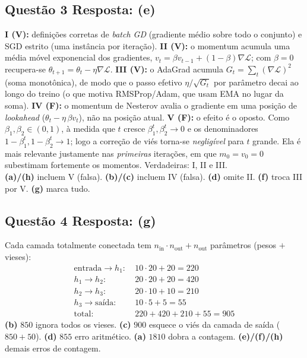 \documentclass[11pt,a4paper]{article}
\begin{document}
\subsection*{Questão 3 \textemdash{} Resposta: (e)}
\textbf{I (V):} definições corretas de \textit{batch GD} (gradiente médio sobre todo o conjunto) e SGD estrito (uma instância por iteração).
\textbf{II (V):} o momentum acumula uma média móvel exponencial dos gradientes, $v_t = \beta v_{t-1} + (1-\beta)\nabla\mathcal{L}$; com $\beta = 0$ recupera-se $\theta_{t+1} = \theta_t - \eta\nabla\mathcal{L}$.
\textbf{III (V):} o AdaGrad acumula $G_t = \sum_t (\nabla\mathcal{L})^2$ (soma monotônica), de modo que o passo efetivo $\eta/\sqrt{G_t}$ por parâmetro decai ao longo do treino (o que motiva RMSProp/Adam, que usam EMA no lugar da soma).
\textbf{IV (F):} o momentum de Nesterov avalia o gradiente em uma posição de \textit{lookahead} ($\theta_t - \eta\,\beta v_t$), não na posição atual.
\textbf{V (F):} o efeito é o oposto. Como $\beta_1, \beta_2 \in (0,1)$, à medida que $t$ cresce $\beta_1^{t}, \beta_2^{t} \to 0$ e os denominadores $1-\beta_1^{t}, 1-\beta_2^{t} \to 1$; logo a correção de viés torna-se \emph{negligível} para $t$ grande. Ela é mais relevante justamente nas \emph{primeiras} iterações, em que $m_0 = v_0 = 0$ subestimam fortemente os momentos.
Verdadeiras: I, II e III.\\
\textbf{(a)/(h)} incluem V (falsa).
\textbf{(b)/(c)} incluem IV (falsa).
\textbf{(d)} omite II.
\textbf{(f)} troca III por V.
\textbf{(g)} marca tudo.

\subsection*{Questão 4 \textemdash{} Resposta: (g)}
Cada camada totalmente conectada tem $n_{\text{in}}\cdot n_{\text{out}} + n_{\text{out}}$ parâmetros (pesos $+$ vieses):
\begin{align*}
    \text{entrada}\to h_1:&\ 10\cdot 20 + 20 = 220 \\
    h_1 \to h_2:&\ 20\cdot 20 + 20 = 420 \\
    h_2 \to h_3:&\ 20\cdot 10 + 10 = 210 \\
    h_3 \to \text{saída}:&\ 10\cdot 5 + 5 = 55 \\
    \hline
    \text{total}:&\ 220 + 420 + 210 + 55 = 905
\end{align*}
\textbf{(b)} $850$ ignora todos os vieses.
\textbf{(c)} $900$ esquece o viés da camada de saída ($850 + 50$).
\textbf{(d)} $855$ erro aritmético.
\textbf{(a)} $1810$ dobra a contagem.
\textbf{(e)/(f)/(h)} demais erros de contagem.
\end{document}
